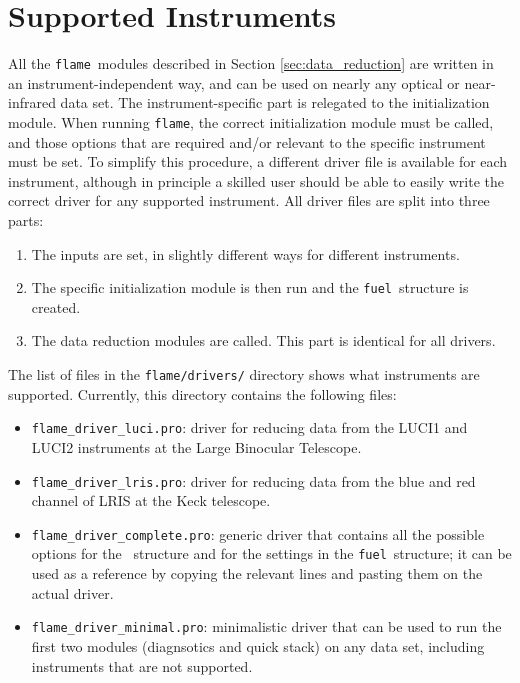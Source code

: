 \documentclass[a4paper]{article}
\newcommand{\flame}{\texttt{flame}}
\newcommand{\fuel}{\texttt{fuel}}
\begin{document}

\section{Supported Instruments}
\label{sec:instruments}

All the \flame\ modules described in Section \ref{sec:data_reduction} are written in an instrument-independent way, and can be used on nearly any optical or near-infrared data set. The instrument-specific part is relegated to the initialization module. When running \flame, the correct initialization module must be called, and those options that are required and/or relevant to the specific instrument must be set. To simplify this procedure, a different driver file is available for each instrument, although in principle a skilled user should be able to easily write the correct driver for any supported instrument. All driver files are split into three parts:
\begin{enumerate}
  \item The inputs are set, in slightly different ways for different instruments.
  \item The specific initialization module is then run and the \fuel\ structure is created.
  \item The data reduction modules are called. This part is identical for all drivers.
\end{enumerate}

The list of files in the \texttt{flame/drivers/} directory shows what instruments are supported. Currently, this directory contains the following files:
\begin{itemize}
  \item[] \texttt{flame\_driver\_luci.pro}: driver for reducing data from the LUCI1 and LUCI2 instruments at the Large Binocular Telescope.
  \item[] \texttt{flame\_driver\_lris.pro}: driver for reducing data from the blue and red channel of LRIS at the Keck telescope.
  \item[] \texttt{flame\_driver\_complete.pro}: generic driver that contains all the possible options for the \ structure and for the settings in the \fuel\ structure; it can be used as a reference by copying the relevant lines and pasting them on the actual driver.
  \item[] \texttt{flame\_driver\_minimal.pro}: minimalistic driver that can be used to run the first two modules (diagnsotics and quick stack) on any data set, including instruments that are not supported.
\end{itemize}
\end{document}
